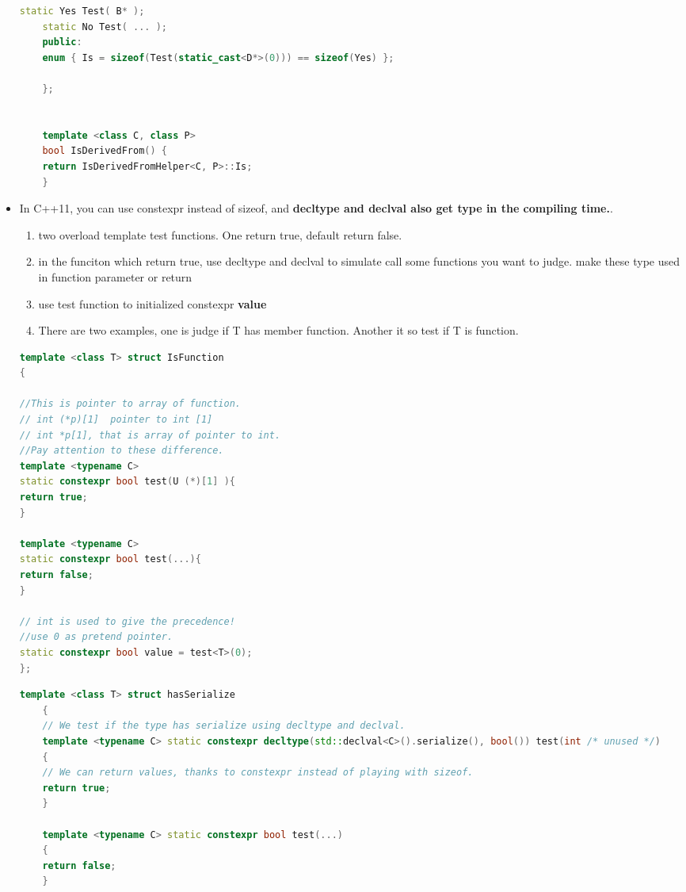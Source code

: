 \documentclass[a4paper,12pt,twoside]{book}
\begin{document}
\begin{itemize}
\begin{lstlisting}[frame=single, language=c++]
	static Yes Test( B* );
	static No Test( ... );
	public:
	enum { Is = sizeof(Test(static_cast<D*>(0))) == sizeof(Yes) };
	
	};
	
	
	template <class C, class P> 
	bool IsDerivedFrom() {
	return IsDerivedFromHelper<C, P>::Is;
	}
	\end{lstlisting}
	
	\item In C++11, you can use constexpr instead of sizeof, and \textbf{decltype and declval also get type in the compiling time.}. 
	\begin{enumerate}
		\item two overload template test functions. One return true, default return false.
		\item in the funciton which return true, use decltype and declval to simulate call some functions you want to judge. make these type used in function parameter or return 
		\item use test function to initialized constexpr \textbf{value} 
		\item There are two examples, one is judge if T has member function. Another it so test if T is function.
	\end{enumerate}
\begin{lstlisting}[frame=single, language=c++]
template <class T> struct IsFunction
{

//This is pointer to array of function.
// int (*p)[1]  pointer to int [1]
// int *p[1], that is array of pointer to int.
//Pay attention to these difference. 
template <typename C> 
static constexpr bool test(U (*)[1] ){
return true;
}

template <typename C> 
static constexpr bool test(...){
return false;
}

// int is used to give the precedence!
//use 0 as pretend pointer.
static constexpr bool value = test<T>(0);
};
\end{lstlisting}

	\begin{lstlisting}[frame=single, language=c++]
	template <class T> struct hasSerialize
	{
	// We test if the type has serialize using decltype and declval.
	template <typename C> static constexpr decltype(std::declval<C>().serialize(), bool()) test(int /* unused */)
	{
	// We can return values, thanks to constexpr instead of playing with sizeof.
	return true;
	}
	
	template <typename C> static constexpr bool test(...)
	{
	return false;
	}
	

\end{lstlisting}
\end{itemize}
\end{document}
